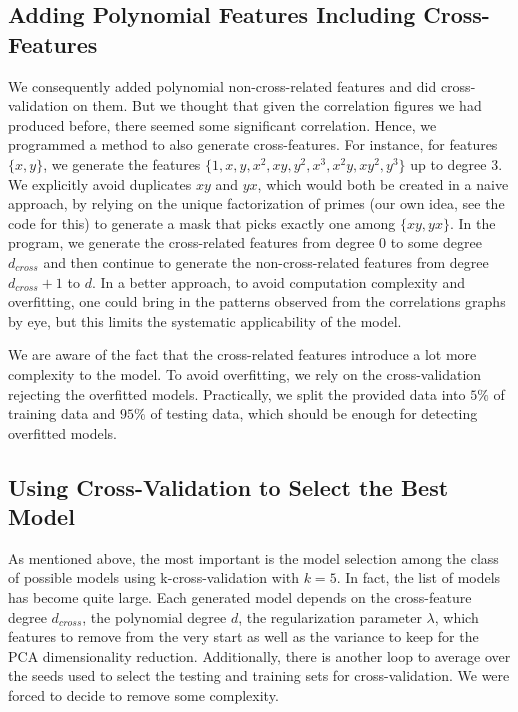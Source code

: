 \documentclass[10pt,conference,compsocconf]{IEEEtran}
\begin{document}
\subsection{Adding Polynomial Features Including Cross-Features}
We consequently added polynomial non-cross-related features and did cross-validation on them. But we thought that given the correlation figures we had produced before, there seemed some significant correlation. Hence, we programmed a method to also generate cross-features. For instance, for features $\{x, y\}$, we generate the features $\{1, x, y, x^2, xy, y^2, x^3, x^2y, xy^2, y^3\}$ up to degree $3$. We explicitly avoid duplicates $xy$ and $yx$, which would both be created in a naive approach, by relying on the unique factorization of primes (our own idea, see the code for this) to generate a mask that picks exactly one among $\{xy,yx\}$. In the program, we generate the cross-related features from degree $0$ to some degree $d_{cross}$ and then continue to generate the non-cross-related features from degree $d_{cross}+1$ to $d$. In a better approach, to avoid computation complexity and overfitting, one could bring in the patterns observed from the correlations graphs by eye, but this limits the systematic applicability of the model.

We are aware of the fact that the cross-related features introduce a lot more complexity to the model. To avoid overfitting, we rely on the cross-validation rejecting the overfitted models. Practically, we split the provided data into $5\%$ of training data and $95\%$ of testing data, which should be enough for detecting overfitted models.

\subsection{Using Cross-Validation to Select the Best Model}
As mentioned above, the most important is the model selection among the class of possible models using k-cross-validation with $k=5$. In fact, the list of models has become quite large. Each generated model depends on the cross-feature degree $d_{cross}$, the polynomial degree $d$, the regularization parameter $\lambda$, which features to remove from the very start as well as the variance to keep for the PCA dimensionality reduction. Additionally, there is another loop to average over the seeds used to select the testing and training sets for cross-validation. We were forced to decide to remove some complexity. 
\end{document}
